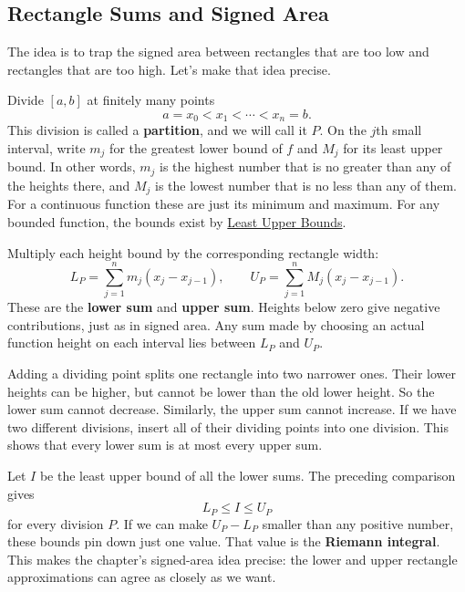 
\subsection*{Rectangle Sums and Signed Area}
\label{sec:rectangle-sum-tools}

The idea is to trap the signed area between rectangles that are too low
and rectangles that are too high. Let's make that idea precise.

Divide $[a,b]$ at finitely many points
$$a=x_0<x_1<\cdots<x_n=b.$$
This division is called a \textbf{partition}, and we will call it $P$.
On the $j$th small interval, write $m_j$ for the greatest lower bound of
$f$ and $M_j$ for its least upper bound. In other words, $m_j$ is the
highest number that is no greater than any of the heights there, and
$M_j$ is the lowest number that is no less than any of them. For a
continuous function these are just its minimum and maximum. For any
bounded function, the bounds exist by
\hyperref[sec:least-upper-bounds]{Least Upper Bounds}.

Multiply each height bound by the corresponding rectangle width:
$$L_P=\sum_{j=1}^n m_j(x_j-x_{j-1}),\qquad
U_P=\sum_{j=1}^n M_j(x_j-x_{j-1}).$$
These are the \textbf{lower sum} and \textbf{upper sum}. Heights below
zero give negative contributions, just as in signed area. Any sum made
by choosing an actual function height on each interval lies between
$L_P$ and $U_P$.

Adding a dividing point splits one rectangle into two narrower ones.
Their lower heights can be higher, but cannot be lower than the old
lower height. So the lower sum cannot decrease. Similarly, the upper
sum cannot increase. If we have two different divisions, insert all
of their dividing points into one division. This shows that every lower
sum is at most every upper sum.

Let $I$ be the least upper bound of all the lower sums. The preceding
comparison gives
$$L_P\leq I\leq U_P$$
for every division $P$. If we can make $U_P-L_P$ smaller than any positive
number, these bounds pin down just one value. That value is the
\textbf{Riemann integral}. This makes the chapter's signed-area idea
precise: the lower and upper rectangle approximations can agree as
closely as we want.

\label{sec:continuous-integrability}

